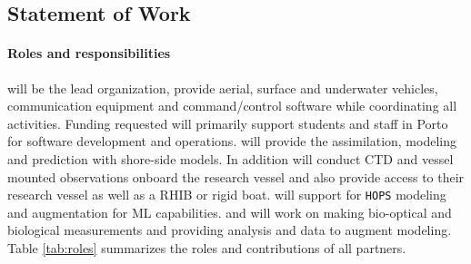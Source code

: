\subsection{Statement of Work}

\paragraph{Roles and responsibilities} \univ will be the lead
organization, provide aerial, surface and underwater vehicles,
communication equipment and command/control software while
coordinating all activities. Funding requested will primarily support
students and staff in Porto for software development and operations.
\inst will provide the assimilation, modeling and prediction with
shore-side models. In addition \inst will conduct CTD and vessel
mounted observations onboard the research vessel and also provide
access to their research vessel as well as a RHIB or rigid boat. \mit
will support \inst for \texttt{HOPS} modeling and augmentation for ML
capabilities. \colo and \ave will work on making bio-optical and
biological measurements and providing analysis and data to augment
\inst modeling. Table \ref{tab:roles} summarizes the roles and
contributions of all partners.

